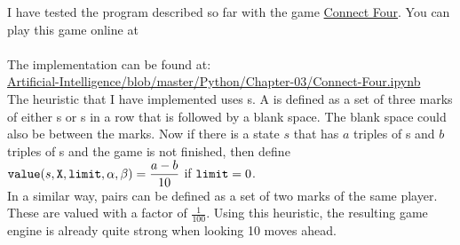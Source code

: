 I have tested the program described so far with the game
\href{https://en.wikipedia.org/wiki/Connect_Four}{Connect Four}.  You can play this game online at 
\\[0.2cm]
\hspace*{1.3cm}
\href{https://connect4.gamesolver.org/en/}{}
\\[0.2cm]
The implementation can be found at:
\\
\hspace*{1.3cm}
\href{https://github.com/karlstroetmann/Artificial-Intelligence/blob/master/Python/3
  Games/Connect-Four.ipynb}{Artificial-Intelligence/blob/master/Python/Chapter-03/Connect-Four.ipynb} 
\\[0.2cm]
The heuristic that I have implemented uses s.  A  is defined as a set of three marks
of either s or s in a row that is followed by a blank space.  The blank space could also be
between the marks.  Now if there is a state $s$ that has $a$ triples of s and $b$ triples of
s and the game is not finished, then define 
\\[0.2cm]
\hspace*{1.3cm}
$\displaystyle \texttt{value}(s, \texttt{X}, \texttt{limit}, \alpha, \beta) = \frac{a - b}{10}$ \quad if $\texttt{limit} = 0$.
\\[0.2cm]
In a similar way, pairs can be defined as a set of two marks of the same player.  These are valued with a
factor of $\frac{1}{100}$.  Using this heuristic, the resulting game engine is already quite strong when
looking 10 moves ahead.

